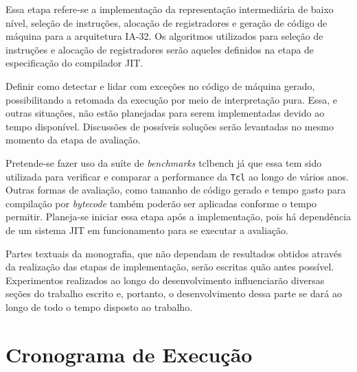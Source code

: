 
Essa etapa refere-se a implementação da representação intermediária de
baixo nível, seleção de instruções, alocação de registradores e
geração de código de máquina para a arquitetura IA-32. Os algoritmos
utilizados para seleção de instruções e alocação de registradores
serão aqueles definidos na etapa de especificação do compilador JIT.



Definir como detectar e lidar com exceções no código de máquina gerado,
possibilitando a retomada da execução por meio de interpretação pura.
Essa, e outras situações, não estão planejadas para serem
implementadas devido ao tempo disponível. Discussões de possíveis
soluções serão levantadas no mesmo momento da etapa de avaliação.


Pretende-se fazer uso da suíte de \textit{benchmarks}
tclbench \cite{tcllib_bench} já que essa tem sido utilizada para verificar
e comparar a performance da \texttt{Tcl} ao longo de vários
anos. Outras formas de avaliação, como tamanho de código gerado e
tempo gasto para compilação por \textit{bytecode} também
poderão ser aplicadas conforme o tempo permitir. Planeja-se iniciar
essa etapa após a implementação, pois há dependência de um sistema JIT
em funcionamento para se executar a avaliação.


Partes textuais da monografia, que não dependam de resultados obtidos
através da realização das etapas de implementação, serão escritas quão
antes possível. Experimentos realizados ao longo do desenvolvimento
influenciarão diversas seções do trabalho escrito e, portanto, o
desenvolvimento dessa parte se dará ao longo de todo o tempo disposto
ao trabalho.


\section{Cronograma de Execução}

